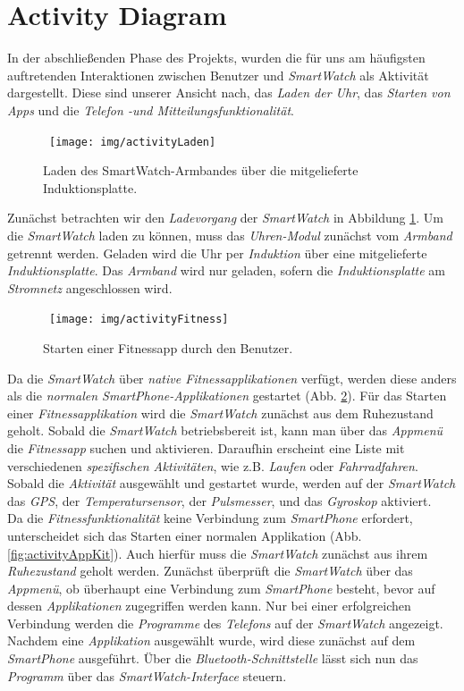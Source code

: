 \section{Activity Diagram}
In der abschließenden Phase des Projekts, wurden die für uns am häufigsten auftretenden Interaktionen zwischen Benutzer und \textit{SmartWatch} als Aktivität dargestellt. Diese sind unserer Ansicht nach, das \textit{Laden der Uhr}, das \textit{Starten von Apps} und die \textit{Telefon -und Mitteilungsfunktionalität}.\\
\begin{figure}[h]
\centering\
\texttt{[image: img/activityLaden]}
\caption{Laden des SmartWatch-Armbandes über die mitgelieferte Induktionsplatte.}\label{fig:activityLaden}
\end{figure}
Zunächst betrachten wir den \textit{Ladevorgang} der \textit{SmartWatch} in Abbildung \ref{fig:activityLaden}.
Um die \textit{SmartWatch} laden zu können, muss das \textit{Uhren-Modul} zunächst vom \textit{Armband} getrennt werden. Geladen wird die Uhr per \textit{Induktion} über eine mitgelieferte \textit{Induktionsplatte}. Das \textit{Armband} wird nur geladen, sofern die \textit{Induktionsplatte} am \textit{Stromnetz} angeschlossen wird.  \\
\begin{figure}[h]
\centering\
\texttt{[image: img/activityFitness]}
\caption{Starten einer Fitnessapp durch den Benutzer.}\label{fig:activityFitness}
\end{figure}
Da die \textit{SmartWatch} über \textit{\gls{native} Fitnessapplikationen} verfügt, werden diese anders als die \textit{normalen SmartPhone-Applikationen} gestartet (Abb. \ref{fig:activityFitness}).
Für das Starten einer \textit{Fitnessapplikation} wird die \textit{SmartWatch} zunächst aus dem Ruhezustand geholt. Sobald die \textit{SmartWatch} betriebsbereit ist, kann man über das \textit{Appmenü} die \textit{Fitnessapp} suchen und aktivieren. Daraufhin erscheint eine Liste mit verschiedenen \textit{spezifischen Aktivitäten}, wie z.B. \textit{Laufen} oder \textit{Fahrradfahren}. Sobald die \textit{Aktivität} ausgewählt und gestartet wurde, werden auf der \textit{SmartWatch} das \textit{GPS}, der \textit{Temperatursensor}, der \textit{Pulsmesser}, und das \textit{Gyroskop} aktiviert.\\
Da die \textit{Fitnessfunktionalität} keine Verbindung zum \textit{SmartPhone} erfordert, unterscheidet sich das Starten einer normalen Applikation (Abb. \ref{fig:activityAppKit}). Auch hierfür muss die \textit{SmartWatch} zunächst aus ihrem \textit{Ruhezustand} geholt werden. Zunächst überprüft die \textit{SmartWatch} über das \textit{Appmenü}, ob überhaupt eine Verbindung zum \textit{SmartPhone} besteht, bevor auf dessen \textit{Applikationen} zugegriffen werden kann. Nur bei einer erfolgreichen Verbindung werden die \textit{Programme} des \textit{Telefons} auf der \textit{SmartWatch} angezeigt. Nachdem eine \textit{Applikation} ausgewählt wurde, wird diese zunächst auf dem \textit{SmartPhone} ausgeführt. Über die \textit{Bluetooth-Schnittstelle} lässt sich nun das \textit{Programm} über das \textit{SmartWatch-Interface} steuern.\\
